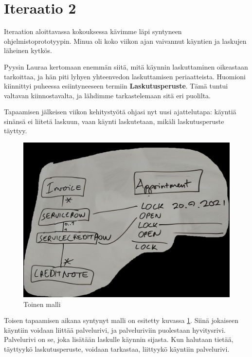 \hypertarget{iteraatio-2}{%
\section{Iteraatio 2}\label{iteraatio-2}}

Iteraation aloittavassa kokouksessa kävimme läpi syntyneen
ohjelmistoprototyypin. Minua oli koko viikon ajan vaivannut käyntien ja
laskujen läheinen kytkös.

Pyysin Lauraa kertomaan enemmän siitä, mitä käynnin laskuttaminen
oikeastaan tarkoittaa, ja hän piti lyhyen yhteenvedon laskuttamisen
periaatteista. Huomioni kiinnittyi puheessa esiintyneeseen termiin
\textbf{Laskutusperuste}. Tämä tuntui valtavan kiinnostavalta, ja
lähdimme tarkastelemaan sitä eri puolilta.

Tapaamisen jälkeisen viikon kehitystyötä ohjasi nyt uusi ajattelutapa:
käyntiä sinänsä ei liitetä laskuun, vaan käynti laskutetaan, mikäli
laskutusperuste täyttyy.

\begin{figure}
\centering
\includegraphics[width=\textwidth,height=0.5\textheight]{illustration/malli2.jpg}
\caption{\label{malli2}Toinen malli}
\end{figure}

Toisen tapaamisen aikana syntynyt malli on esitetty kuvassa
\ref{malli2}. Siinä jokaiseen käyntiin voidaan liittää palvelurivi, ja
palveluriviin puolestaan hyvitysrivi. Palvelurivi on se, joka lisätään
laskulle käynnin sijasta. Kun halutaan tietää, täyttyykö
laskutusperuste, voidaan tarkastaa, liittyykö käyntiin palvelurivi.

